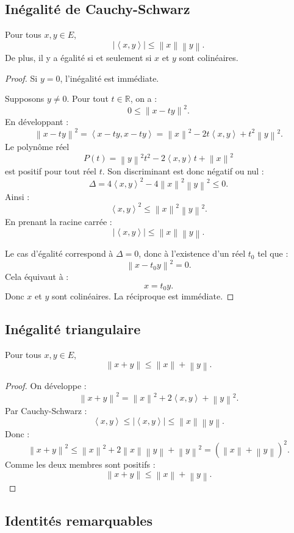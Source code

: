 \documentclass[11pt,a4paper]{article}
\newcommand{\R}{\mathbb R}
\newcommand{\norme}[1]{\left\lVert #1\right\rVert}
\newcommand{\scal}[2]{\left\langle #1,#2\right\rangle}
\begin{document}
\subsection{Inégalité de Cauchy-Schwarz}

\begin{theorembox}
Pour tous \(x,y\in E\),
\[
|\scal{x}{y}|\leq \norme{x}\norme{y}.
\]
De plus, il y a égalité si et seulement si \(x\) et \(y\) sont colinéaires.
\end{theorembox}

\begin{proof}
Si \(y=0\), l'inégalité est immédiate.

Supposons \(y\neq0\).  
Pour tout \(t\in\R\), on a :
\[
0\leq \norme{x-ty}^2.
\]
En développant :
\[
\norme{x-ty}^2
=
\scal{x-ty}{x-ty}
=
\norme{x}^2-2t\scal{x}{y}+t^2\norme{y}^2.
\]
Le polynôme réel
\[
P(t)=\norme{y}^2t^2-2\scal{x}{y}t+\norme{x}^2
\]
est positif pour tout réel \(t\).  
Son discriminant est donc négatif ou nul :
\[
\Delta
=
4\scal{x}{y}^2-4\norme{x}^2\norme{y}^2
\leq0.
\]
Ainsi :
\[
\scal{x}{y}^2\leq\norme{x}^2\norme{y}^2.
\]
En prenant la racine carrée :
\[
|\scal{x}{y}|\leq\norme{x}\norme{y}.
\]

Le cas d'égalité correspond à \(\Delta=0\), donc à l'existence d'un réel \(t_0\) tel que :
\[
\norme{x-t_0y}^2=0.
\]
Cela équivaut à :
\[
x=t_0y.
\]
Donc \(x\) et \(y\) sont colinéaires.  
La réciproque est immédiate.
\end{proof}

\subsection{Inégalité triangulaire}

\begin{theorembox}
Pour tous \(x,y\in E\),
\[
\norme{x+y}\leq\norme{x}+\norme{y}.
\]
\end{theorembox}

\begin{proof}
On développe :
\[
\norme{x+y}^2
=
\norme{x}^2+2\scal{x}{y}+\norme{y}^2.
\]
Par Cauchy-Schwarz :
\[
\scal{x}{y}\leq |\scal{x}{y}|\leq\norme{x}\norme{y}.
\]
Donc :
\[
\norme{x+y}^2
\leq
\norme{x}^2+2\norme{x}\norme{y}+\norme{y}^2
=
(\norme{x}+\norme{y})^2.
\]
Comme les deux membres sont positifs :
\[
\norme{x+y}\leq\norme{x}+\norme{y}.
\]
\end{proof}

\subsection{Identités remarquables}
\end{document}
